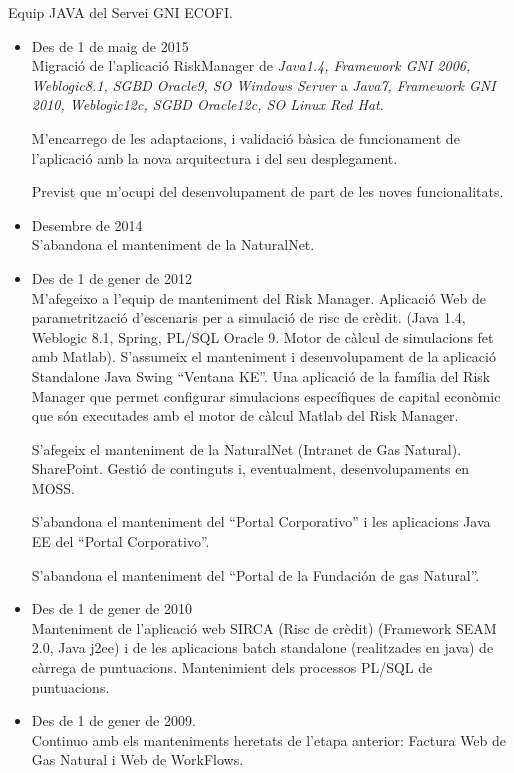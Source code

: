\documentclass[11pt]{article}
\begin{document}
Equip JAVA del Servei GNI ECOFI.
\begin{itemize}

\item Des de 1 de maig de 2015\\
\label{sec-5-1-3-1}%
Migració de l'aplicació RiskManager de \emph{Java1.4, Framework GNI 2006,  Weblogic8.1, SGBD Oracle9, SO Windows Server}  a  \emph{Java7, Framework GNI 2010, Weblogic12c, SGBD Oracle12c, SO Linux Red Hat}.

M'encarrego de les adaptacions, i validació bàsica de funcionament de l'aplicació amb la nova arquitectura  i del seu desplegament.

Previst que m'ocupi del desenvolupament de part de les noves funcionalitats.


\item Desembre de 2014\\
\label{sec-5-1-3-2}%
S'abandona el manteniment de la NaturalNet.


\item Des de 1 de gener de 2012\\
\label{sec-5-1-3-3}%
M'afegeixo a l'equip de manteniment del Risk Manager. Aplicació Web de parametrització d'escenaris per a simulació de risc de crèdit. (Java 1.4, Weblogic 8.1, Spring, PL/SQL Oracle 9. Motor de càlcul de simulacions fet amb Matlab). S'assumeix el manteniment i desenvolupament de la aplicació Standalone Java Swing ``Ventana KE''. Una aplicació de la família del Risk Manager que permet configurar simulacions específiques de capital econòmic que són executades amb el motor de càlcul Matlab del Risk Manager.    

S'afegeix el manteniment de la NaturalNet (Intranet de Gas Natural). SharePoint. Gestió de continguts i, eventualment, desenvolupaments en MOSS.

S'abandona el manteniment del ``Portal Corporativo'' i les aplicacions Java EE del ``Portal Corporativo''. 

S'abandona el manteniment del ``Portal de la Fundación de gas Natural''.


\item Des de 1 de gener de 2010\\
\label{sec-5-1-3-4}%
Manteniment de l'aplicació web SIRCA (Risc de crèdit) (Framework SEAM 2.0, Java j2ee) i de les aplicacions batch standalone (realitzades en java) de càrrega de puntuacions. Mantenimient dels processos PL/SQL de puntuacions.


\item Des de 1 de gener de 2009.\\
\label{sec-5-1-3-5}%
Continuo amb els manteniments heretats de l’etapa anterior: Factura Web de Gas Natural i Web de WorkFlows.


\end{itemize}
\end{document}
